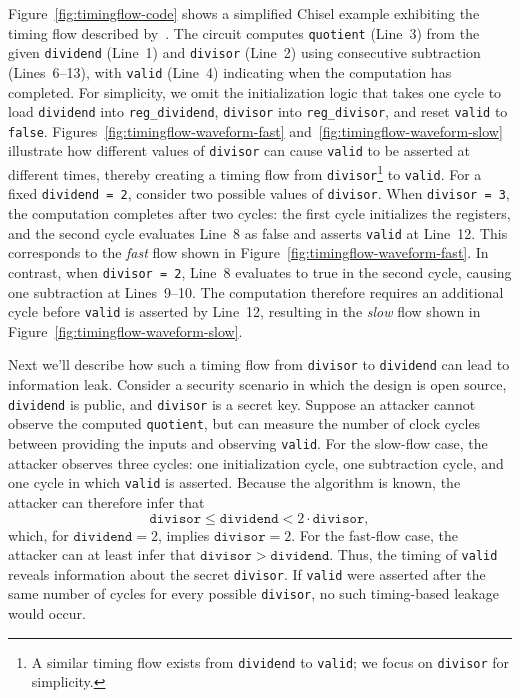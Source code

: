 Figure~\ref{fig:timingflow-code} shows a simplified Chisel example exhibiting the timing flow described by~\cite{ardeshiricham_clepsydra_2017}.
The circuit computes \texttt{quotient} (Line~3) from the given \texttt{dividend} (Line~1) and \texttt{divisor} (Line~2) using consecutive subtraction (Lines~6--13), with \texttt{valid} (Line~4) indicating when the computation has completed.
For simplicity, we omit the initialization logic that takes one cycle to load \texttt{dividend} into \texttt{reg\_dividend}, \texttt{divisor} into \texttt{reg\_divisor}, and reset \texttt{valid} to \texttt{false}.
Figures~\ref{fig:timingflow-waveform-fast} and~\ref{fig:timingflow-waveform-slow} illustrate how different values of \texttt{divisor} can cause \texttt{valid} to be asserted at different times, thereby creating a timing flow from \texttt{divisor}\footnote{A similar timing flow exists from \texttt{dividend} to \texttt{valid}; we focus on \texttt{divisor} for simplicity.} to \texttt{valid}.
For a fixed \texttt{dividend = 2}, consider two possible values of \texttt{divisor}.
When \texttt{divisor = 3}, the computation completes after two cycles: the first cycle initializes the registers, and the second cycle evaluates Line~8 as false and asserts \texttt{valid} at Line~12.
This corresponds to the \emph{fast} flow shown in Figure~\ref{fig:timingflow-waveform-fast}.
In contrast, when \texttt{divisor = 2}, Line~8 evaluates to true in the second cycle, causing one subtraction at Lines~9--10.
The computation therefore requires an additional cycle before \texttt{valid} is asserted by Line~12, resulting in the \emph{slow} flow shown in Figure~\ref{fig:timingflow-waveform-slow}.

Next we'll describe how such a timing flow from \texttt{divisor} to \texttt{dividend} can lead to information leak.
Consider a security scenario in which the design is open source, \texttt{dividend} is public, and \texttt{divisor} is a secret key.
Suppose an attacker cannot observe the computed \texttt{quotient}, but can measure the number of clock cycles between providing the inputs and observing \texttt{valid}.
For the slow-flow case, the attacker observes three cycles: one initialization cycle, one subtraction cycle, and one cycle in which \texttt{valid} is asserted.
Because the algorithm is known, the attacker can therefore infer that
\[
\mathtt{divisor} \leq \mathtt{dividend}
< 2\cdot\mathtt{divisor},
\]
which, for $\mathtt{dividend}=2$, implies $\mathtt{divisor}=2$.
For the fast-flow case, the attacker can at least infer that $\mathtt{divisor} > \mathtt{dividend}$.
Thus, the timing of \texttt{valid} reveals information about the secret \texttt{divisor}.
If \texttt{valid} were asserted after the same number of cycles for every possible \texttt{divisor}, no such timing-based leakage would occur.

